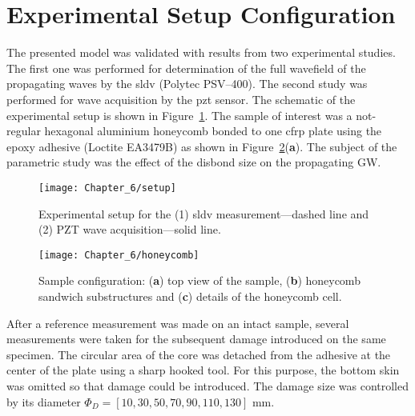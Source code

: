 \section{Experimental Setup Configuration}
\label{sec:setup}


The presented model was validated with results from two experimental studies.
The first one was performed for determination of the full wavefield of the propagating waves by the \ac{sldv} (Polytec PSV–400).
The second study was performed for wave acquisition by the \ac{pzt} sensor.
The schematic of the experimental setup is shown in Figure~\ref{fig:setup}.
The sample of interest was a not-regular hexagonal aluminium honeycomb bonded to one \ac{cfrp} plate  using the epoxy adhesive (Loctite EA3479B) as shown in Figure~\ref{fig:honeycomb}(\textbf{a}).%
The subject of the parametric study was the effect of the disbond size on the propagating GW.

\begin{figure}[H]
	\texttt{[image: Chapter\_6/setup]}
	\caption{Experimental setup for the (1) \ac{sldv} measurement---dashed line and (2) PZT wave acquisition---solid line.}
	\label{fig:setup}
\end{figure}
\vspace{-12pt}
\begin{figure}[H]
	\texttt{[image: Chapter\_6/honeycomb]}
	\caption{Sample configuration: (\textbf{a}) top view of the sample, (\textbf{b}) honeycomb sandwich substructures and (\textbf{c}) details of the honeycomb cell.}
	\label{fig:honeycomb}
\end{figure}


After a reference measurement was made on an intact sample, several measurements were taken for the subsequent damage introduced on the same specimen.
The circular area of the core was detached from the adhesive at the center of the plate using a sharp hooked tool.
For this purpose, the bottom skin was omitted so that damage could be introduced.
The damage size was controlled by its diameter \(\Phi_D=\left [10, 30, 50, 70, 90, 110, 130 \right ]\) mm.

